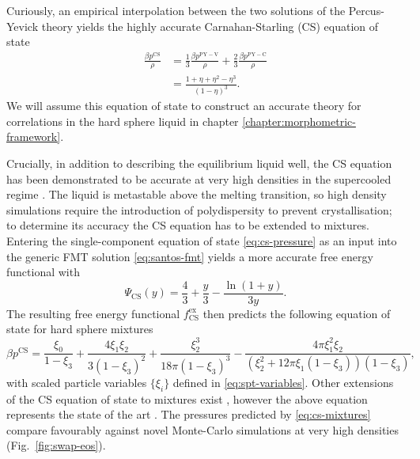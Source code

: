 Curiously, an empirical interpolation between the two solutions of the Percus-Yevick theory yields the highly accurate Carnahan-Starling (CS) equation of state \cite{CarnahanJCP1969}
\begin{equation}\label{eq:cs-pressure}
  \begin{split}
    \frac{\beta p^\mathrm{CS}}{\rho}
    &=
    \frac{1}{3} \frac{\beta p^\mathrm{PY-V}}{\rho}
    + \frac{2}{3} \frac{\beta p^\mathrm{PY-C}}{\rho}
    \\ &=
    \frac{1 + \eta + \eta^2 - \eta^3}{(1-\eta)^3}.
  \end{split}
\end{equation}
We will assume this equation of state to construct an accurate theory for correlations in the hard sphere liquid in chapter \ref{chapter:morphometric-framework}.

Crucially, in addition to describing the equilibrium liquid well, the CS equation has been demonstrated to be accurate at very high densities in the supercooled regime \cite{BerthierPRL2016}.
The liquid is metastable above the melting transition, so high density simulations require the introduction of polydispersity %
to prevent crystallisation; to determine its accuracy the CS equation has to be extended to mixtures.
Entering the single-component equation of state \eqref{eq:cs-pressure} as an input into the generic FMT solution \eqref{eq:santos-fmt} yields a more accurate free energy functional with \cite{SantosPRE2012}
\begin{equation}\label{eq:cs-fmt}
  \Psi_\mathrm{CS}(y)
  =
  \frac{4}{3} + \frac{y}{3} - \frac{\ln{(1 + y)}}{3y}.
\end{equation}
The resulting free energy functional $f^\mathrm{ex}_\mathrm{CS}$ then predicts the following equation of state for hard sphere mixtures \cite{SantosPRE2012}
\begin{equation}\label{eq:cs-mixtures}
  \beta p^\mathrm{CS}
  =
  \frac{\xi_0}{1 - \xi_3}
  + \frac{4 \xi_1 \xi_2}{3 (1 - \xi_3)^2}
  + \frac{\xi_2^3}{18 \pi (1 - \xi_3)^3}
  - \frac{4 \pi \xi_1^2 \xi_2}{(\xi_2^2 + 12\pi \xi_1 (1 - \xi_3)) (1 - \xi_3)},
\end{equation}
with scaled particle variables $\{\xi_i\}$ defined in \eqref{eq:spt-variables}.
Other extensions of the CS equation of state to mixtures exist%
,
however the above equation represents the state of the art \cite{SantosPRE2012}.
The pressures predicted by \eqref{eq:cs-mixtures} compare favourably against novel Monte-Carlo simulations at very high densities (Fig.\ \ref{fig:swap-eos}).

